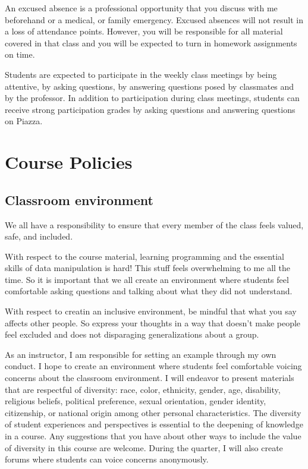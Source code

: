 \documentclass[11pt,]{article}
\begin{document}
An excused absence is a professional opportunity that you discuss with
me beforehand or a medical, or family emergency. Excused absences will
not result in a loss of attendance points. However, you will be
responsible for all material covered in that class and you will be
expected to turn in homework assignments on time.

Students are expected to participate in the weekly class meetings by
being attentive, by asking questions, by answering questions posed by
classmates and by the professor. In addition to participation during
class meetings, students can receive strong participation grades by
asking questions and answering questions on Piazza.

\section{Course Policies}\label{course-policies}

\subsection{Classroom environment}\label{classroom-environment}

We all have a responsibility to ensure that every member of the class
feels valued, safe, and included.

With respect to the course material, learning programming and the
essential skills of data manipulation is hard! This stuff feels
overwhelming to me all the time. So it is important that we all create
an environment where students feel comfortable asking questions and
talking about what they did not understand.

With respect to creatin an inclusive environment, be mindful that what
you say affects other people. So express your thoughts in a way that
doesn't make people feel excluded and does not disparaging
generalizations about a group.

As an instructor, I am responsible for setting an example through my own
conduct. I hope to create an environment where students feel comfortable
voicing concerns about the classroom environment. I will endeavor to
present materials that are respectful of diversity: race, color,
ethnicity, gender, age, disability, religious beliefs, political
preference, sexual orientation, gender identity, citizenship, or
national origin among other personal characteristics. The diversity of
student experiences and perspectives is essential to the deepening of
knowledge in a course. Any suggestions that you have about other ways to
include the value of diversity in this course are welcome. During the
quarter, I will also create forums where students can voice concerns
anonymously.
\end{document}
